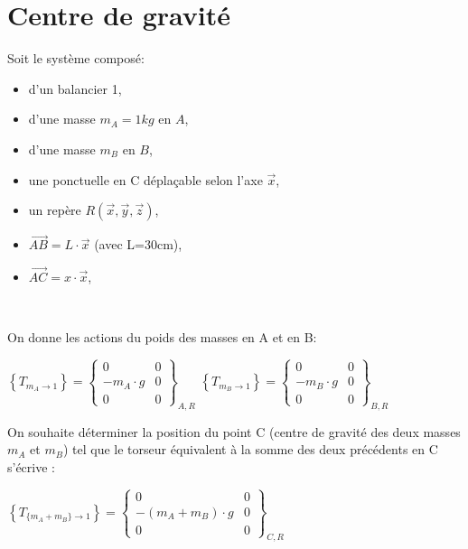 

\section{Centre de gravité}

\begin{minipage}{0.48\linewidth}
   \def\svgwidth{0.9\linewidth}
   
\end{minipage}
\hfill
\begin{minipage}{0.48\linewidth}
Soit le système composé:
\begin{itemize}
\item d'un balancier 1,
\item d'une masse $m_A=1kg$ en $A$,
\item d'une masse $m_B$ en $B$,
\item une ponctuelle en C déplaçable selon l'axe $\vec{x}$,
\item un repère $R(\vec{x},\vec{y},\vec{z})$,
\item $\overrightarrow{AB}=L\cdot\vec{x}$ (avec L=30cm),
\item $\overrightarrow{AC}=x\cdot\vec{x}$,
\end{itemize}
\end{minipage}

~\

On donne les actions du poids des masses en A et en B:

\begin{center}
$\left\{T_{m_A\rightarrow 1}\right\}=\left\{\begin{array}{cc}
0&0\\-m_A\cdot g&0\\0&0
\end{array}\right\}_{A,R}$
$\left\{T_{m_B\rightarrow 1}\right\}=\left\{\begin{array}{cc}
0&0\\-m_B\cdot g&0\\0&0
\end{array}\right\}_{B,R}$
\end{center}

On souhaite déterminer la position du point C (centre de gravité des deux masses $m_A$ et $m_B$) tel que le torseur équivalent à la somme des deux précédents en C s'écrive :

\begin{center}
$\left\{T_{\{m_A+m_B\}\rightarrow 1}\right\}=\left\{\begin{array}{cc}
0&0\\-(m_A+m_B)\cdot g&0\\0&0
\end{array}\right\}_{C,R}$
\end{center}

